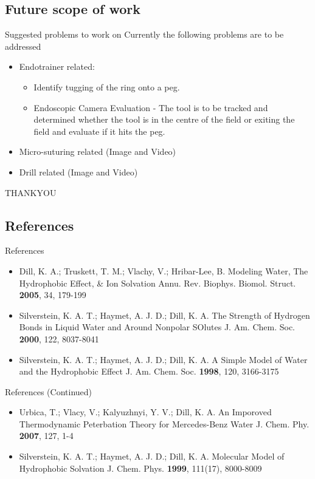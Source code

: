 \documentclass{beamer}
\begin{document}
\subsection{Future scope of work}

\begin{frame}{Suggested problems to work on}
\Large Currently the following problems are to be addressed
\begin{itemize}
\item Endotrainer related:
\begin{itemize}
\item \Large Identify tugging of the ring onto a peg.
\item \Large  Endoscopic Camera Evaluation - The tool is to be tracked and determined whether the tool is in the centre of the field or exiting the field and evaluate if it hits the peg.
\end{itemize}

\item Micro-suturing related (Image and Video)
\item Drill related (Image and Video)
\end{itemize}
\end{frame}
\begin{frame}
\centering \LARGE THANKYOU
\end{frame}

\subsection{References}
\begin{frame}{References}
\begin{itemize}
  \item Dill, K. A.; Truskett, T. M.; Vlachy, V.; Hribar-Lee, B. Modeling Water, The Hydrophobic Effect, \& Ion Solvation Annu. Rev. Biophys. Biomol. Struct. \textbf{2005}, 34, 179-199
  \item Silverstein, K. A. T.; Haymet, A. J. D.; Dill, K. A. The Strength of Hydrogen Bonds in Liquid Water and Around Nonpolar SOlutes J. Am. Chem. Soc. \textbf{2000}, 122, 8037-8041
  \item Silverstein, K. A. T.; Haymet, A. J. D.; Dill, K. A. A Simple Model of Water and the Hydrophobic Effect J. Am. Chem. Soc. \textbf{1998}, 120, 3166-3175
\end{itemize}
\end{frame}

\begin{frame}{References (Continued)}
\begin{itemize}
  \item Urbica, T.; Vlacy, V.; Kalyuzhnyi, Y. V.; Dill, K. A. An Imporoved Thermodynamic Peterbation Theory for Mercedes-Benz Water J. Chem. Phy. \textbf{2007}, 127, 1-4
  \item Silverstein, K. A. T.; Haymet, A. J. D.; Dill, K. A. Molecular Model of Hydrophobic Solvation J. Chem. Phys. \textbf{1999}, 111(17), 8000-8009 
\end{itemize}
\end{frame}
\end{document}
